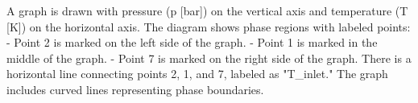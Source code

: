 A graph is drawn with pressure (p [bar]) on the vertical axis and temperature (T [K]) on the horizontal axis. The diagram shows phase regions with labeled points:  
- Point 2 is marked on the left side of the graph.  
- Point 1 is marked in the middle of the graph.  
- Point 7 is marked on the right side of the graph.  
There is a horizontal line connecting points 2, 1, and 7, labeled as "T_inlet." The graph includes curved lines representing phase boundaries.